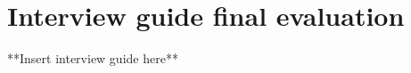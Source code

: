 \documentclass[../Main/thesis.tex]{subfiles}
\begin{document}
\chapter{Interview guide final evaluation}
\label{app:interview-guide-final}
**Insert interview guide here**
\end{document}
